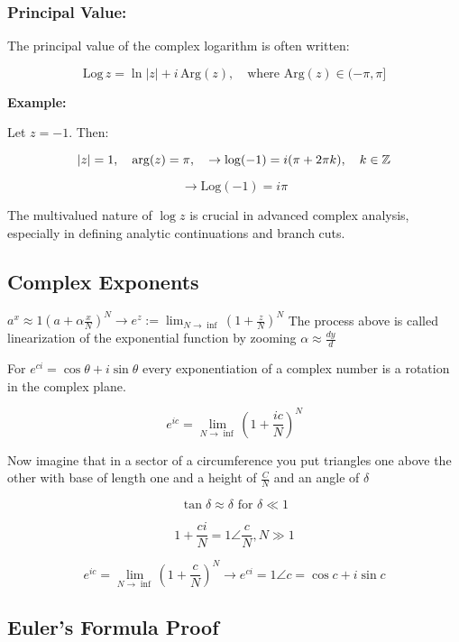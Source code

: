 \subsubsection*{Principal Value:}

The principal value of the complex logarithm is often written:

\[
	\mathrm{Log}\,z = \ln |z| + i\,\mathrm{Arg}(z), \quad \text{where } \mathrm{Arg}(z) \in (-\pi, \pi]
\]

\textbf{Example:}
\vspace{\baselineskip}

Let \( z = -1 \). Then:

\[
	|z| = 1, \quad \arg(z) = \pi, \quad \to \log(-1) = i(\pi + 2\pi k), \quad k \in \mathbb{Z}
\]

\[
	\to \mathrm{Log}(-1) = i\pi
\]

The multivalued nature of \( \log z \) is crucial in advanced complex analysis, especially in defining analytic continuations and branch cuts.

\subsection{Complex Exponents}

\(a^x \approx 1 {\left(a + \alpha \frac{x}{N} \right)}^N \to e^z := \lim_{N \rightarrow \inf} {\left( 1 + \frac{z}{N}\right)}^N \)
The process above is called linearization of the exponential function by zooming  \(\alpha \approx \frac{dy}{d}\)
\vspace{\baselineskip}

For  \(e^{ci} = \cos{\theta} + i\sin{\theta}\) every exponentiation of a complex number is a rotation 
in the complex plane.

\[
	e^{ic} = \lim_{N \to \inf} {\left( 1 + \frac{ic}{N}\right)}^N
\]

Now imagine that in a sector of a circumference you put triangles one above the other with base of length one and a height of \(\frac{C}{N}\) and 
an angle of \(\delta\)

\[
	\tan{\delta} \approx \delta \text{ for } \delta \ll 1
\]

\[
	1 + \frac{ci}{N} = 1 \angle \frac{c}{N}, N \gg 1
\]

\[
	e^{ic} = \lim_{N \to \inf} {\left( 1 + \frac{c}{N}\right)}^N \to e^{ci} = 1 \angle c = \cos{c} + i\sin{c}
\]

\subsection{Euler's Formula Proof}

